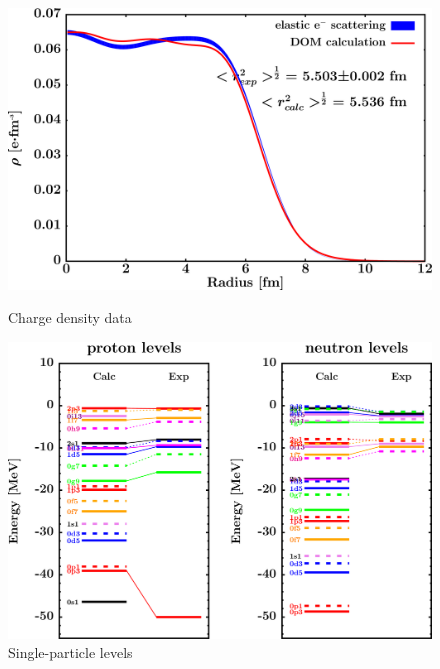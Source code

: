 \begin{figure}[H]
    \centering
    \begin{minipage}{0.45\textwidth}
        \centering
        \includegraphics[width=1.0\textwidth]{figures/pb208_chargeDensity.png}
        \caption{Charge density data}
        \label{DOMFitData_pb208_chargeDensity}
    \end{minipage}\hfill
    \begin{minipage}{0.45\textwidth}
        \centering
        \includegraphics[width=1.0\textwidth]{figures/pb208_SPLevels.png}
        \caption{Single-particle levels}
        \label{DOMFitData_pb208_SPLevels}
    \end{minipage}
\end{figure}

\afterpage{\clearpage}

